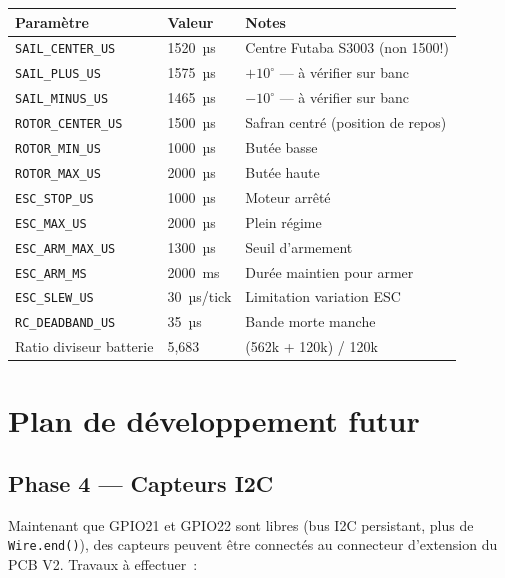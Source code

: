 \documentclass[12pt,a4paper]{article}
\begin{document}
\begin{longtable}{L{5cm} C{2cm} L{5.5cm}}
  \toprule
  \textcolor{tableheadfg}{\textbf{Paramètre}} &
  \textcolor{tableheadfg}{\textbf{Valeur}} &
  \textcolor{tableheadfg}{\textbf{Notes}} \\
  \midrule
  \endhead
  \bottomrule
  \endfoot
  \texttt{SAIL\_CENTER\_US} & 1520~µs & Centre Futaba S3003 (non 1500!) \\[3pt]
  \texttt{SAIL\_PLUS\_US} & 1575~µs & $+10^{\circ}$ — à vérifier sur banc \\[3pt]
  \texttt{SAIL\_MINUS\_US} & 1465~µs & $-10^{\circ}$ — à vérifier sur banc \\[3pt]
  \texttt{ROTOR\_CENTER\_US} & 1500~µs & Safran centré (position de repos) \\[3pt]
  \texttt{ROTOR\_MIN\_US} & 1000~µs & Butée basse \\[3pt]
  \texttt{ROTOR\_MAX\_US} & 2000~µs & Butée haute \\[3pt]
  \texttt{ESC\_STOP\_US} & 1000~µs & Moteur arrêté \\[3pt]
  \texttt{ESC\_MAX\_US} & 2000~µs & Plein régime \\[3pt]
  \texttt{ESC\_ARM\_MAX\_US} & 1300~µs & Seuil d'armement \\[3pt]
  \texttt{ESC\_ARM\_MS} & 2000~ms & Durée maintien pour armer \\[3pt]
  \texttt{ESC\_SLEW\_US} & 30~µs/tick & Limitation variation ESC \\[3pt]
  \texttt{RC\_DEADBAND\_US} & 35~µs & Bande morte manche \\[3pt]
  Ratio diviseur batterie & 5,683 & (562k + 120k) / 120k \\
\end{longtable}

\section{Plan de développement futur}

\subsection{Phase 4 — Capteurs I2C}

Maintenant que GPIO21 et GPIO22 sont libres (bus I2C persistant, plus de
\texttt{Wire.end()}), des capteurs peuvent être connectés au connecteur
d'extension du PCB V2. Travaux à effectuer~:
\end{document}
